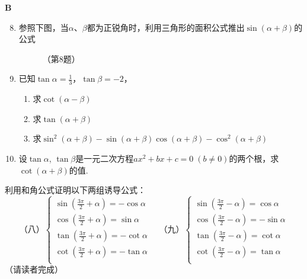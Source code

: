 \begin{center}
    \bfseries B
\end{center}

\begin{enumerate}\setcounter{enumi}{7}
    \item 参照下图，当$\alpha$、$\beta$都为正锐角时，利用三角形的面积公式推出$\sin(\alpha+\beta)$的公式
\begin{figure}[htp]
    \centering
{}
    \caption*{（第8题）}
\end{figure}

\item 已知$\tan\alpha=\frac{1}{3}$，$\tan\beta=-2$，
\begin{enumerate}[(1)]
    \item 求$\cot(\alpha-\beta)$
    \item 求$\tan(\alpha+\beta)$
    \item 求$\sin^2(\alpha+\beta)-\sin(\alpha+\beta)\cos(\alpha+\beta)-\cos^2(\alpha+\beta)$
\end{enumerate}

\item 设$\tan\alpha$, $\tan\beta$是一元二次方程$ax^2+bx+c=0\; (b\ne 0)$的两个根，求$\cot(\alpha+\beta)$的值.
\end{enumerate}

\begin{example}
 利用和角公式证明以下两组诱导公式：  
\[\text{（八）}\begin{cases}
    \sin\left(\frac{3\pi}{2}+\alpha\right)=-\cos\alpha\\
    \cos\left(\frac{3\pi}{2}+\alpha\right)=\sin\alpha\\
    \tan\left(\frac{3\pi}{2}+\alpha\right)=-\cot\alpha\\
    \cot\left(\frac{3\pi}{2}+\alpha\right)=-\tan\alpha\\
\end{cases}\quad \text{（九）}\begin{cases}
    \sin\left(\frac{3\pi}{2}-\alpha\right)=\cos\alpha\\
    \cos\left(\frac{3\pi}{2}-\alpha\right)=-\sin\alpha\\
    \tan\left(\frac{3\pi}{2}-\alpha\right)=\cot\alpha\\
    \cot\left(\frac{3\pi}{2}-\alpha\right)=\tan\alpha\\
\end{cases}\]
 （请读者完成）
\end{example}


